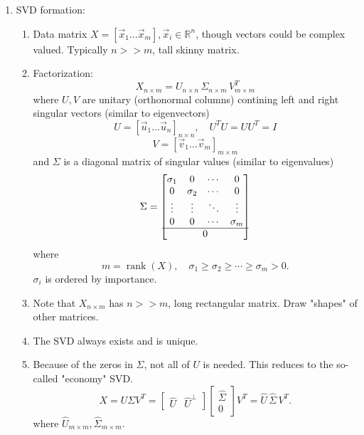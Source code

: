 \documentclass{article}
\begin{document}
\begin{enumerate}
\item SVD formation:
\begin{enumerate}
\item Data matrix $X = \left[ \vec{x}_1 \dots \vec{x}_m \right], \vec{x}_i \in \mathbb{R}^n$, though vectors could be complex valued. Typically $n >> m$, tall skinny matrix.
\item Factorization:
\[
X_{n \times m} = U_{n \times n} \, \Sigma_{n \times m} \, V_{m \times m}^{T}
\]
where $U,V$ are unitary (orthonormal columns) contining left and right singular vectors (similar to eigenvectors) 
\[
U = \left[\vec{u}_1 \dots \vec{u}_n \right]_{n \times n}, \quad U^T U = U U^T = I
\]
\[
V = \left[\vec{v}_1 \dots \vec{v}_m \right]_{m \times m}
\]
and $\Sigma$ is a diagonal matrix of singular values (similar to eigenvalues)
\[
\Sigma =
\begin{bmatrix}
\sigma_1 & 0 & \cdots & 0 \\
0 & \sigma_2 & \cdots & 0 \\
\vdots & \vdots & \ddots & \vdots \\
0 & 0 & \cdots & \sigma_m \\
\hline
\multicolumn{4}{c}{\Large 0}
\end{bmatrix}
\]
where
\[
m = \operatorname{rank}(X), \quad
\sigma_1 \ge \sigma_2 \ge \cdots \ge \sigma_m > 0.
\]
$\sigma_i$ is ordered by importance.
\item Note that $X_{n \times m}$ has $n >> m$, long rectangular matrix. Draw "shapes" of other matrices.
\item The SVD always exists and is unique.
\item Because of the zeros in $\Sigma$, not all of $U$ is needed. This reduces to the so-called "economy" SVD.
\[
X = U \Sigma V^{T}
=
\begin{bmatrix}
\widehat{U} & \widehat{U}^{\perp}
\end{bmatrix}
\begin{bmatrix}
\widehat{\Sigma} \\
0
\end{bmatrix}
V^{T}
=
\widehat{U}\,\widehat{\Sigma}\,V^{T}.
\]
where $\widehat{U}_{m \times m}, \widehat{\Sigma}_{m \times m}$.
\end{enumerate}


\end{enumerate}
\end{document}
